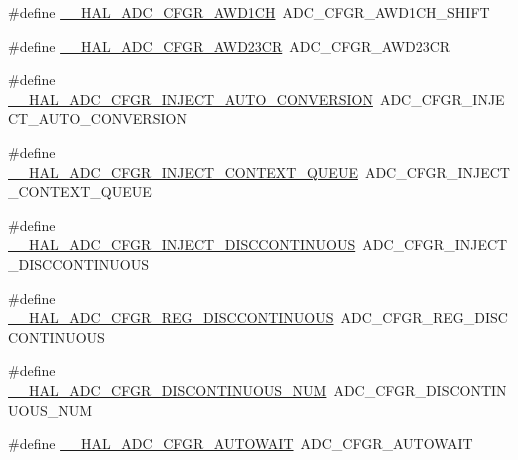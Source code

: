 \begin{DoxyCompactItemize}
\item 
\#define \hyperlink{group___h_a_l___a_d_c___aliased___macros_gaf2b93300d6c91bbe5a0253368ade466f}{\+\_\+\+\_\+\+H\+A\+L\+\_\+\+A\+D\+C\+\_\+\+C\+F\+G\+R\+\_\+\+A\+W\+D1\+CH}~A\+D\+C\+\_\+\+C\+F\+G\+R\+\_\+\+A\+W\+D1\+C\+H\+\_\+\+S\+H\+I\+FT
\item 
\#define \hyperlink{group___h_a_l___a_d_c___aliased___macros_ga73200fff4fe5aa62989ea33522fa3cfc}{\+\_\+\+\_\+\+H\+A\+L\+\_\+\+A\+D\+C\+\_\+\+C\+F\+G\+R\+\_\+\+A\+W\+D23\+CR}~A\+D\+C\+\_\+\+C\+F\+G\+R\+\_\+\+A\+W\+D23\+CR
\item 
\#define \hyperlink{group___h_a_l___a_d_c___aliased___macros_ga16b4ff7c58c0fe8141bd8bf6adf0f27c}{\+\_\+\+\_\+\+H\+A\+L\+\_\+\+A\+D\+C\+\_\+\+C\+F\+G\+R\+\_\+\+I\+N\+J\+E\+C\+T\+\_\+\+A\+U\+T\+O\+\_\+\+C\+O\+N\+V\+E\+R\+S\+I\+ON}~A\+D\+C\+\_\+\+C\+F\+G\+R\+\_\+\+I\+N\+J\+E\+C\+T\+\_\+\+A\+U\+T\+O\+\_\+\+C\+O\+N\+V\+E\+R\+S\+I\+ON
\item 
\#define \hyperlink{group___h_a_l___a_d_c___aliased___macros_ga5010d7820f890534d6b6005438038ef5}{\+\_\+\+\_\+\+H\+A\+L\+\_\+\+A\+D\+C\+\_\+\+C\+F\+G\+R\+\_\+\+I\+N\+J\+E\+C\+T\+\_\+\+C\+O\+N\+T\+E\+X\+T\+\_\+\+Q\+U\+E\+UE}~A\+D\+C\+\_\+\+C\+F\+G\+R\+\_\+\+I\+N\+J\+E\+C\+T\+\_\+\+C\+O\+N\+T\+E\+X\+T\+\_\+\+Q\+U\+E\+UE
\item 
\#define \hyperlink{group___h_a_l___a_d_c___aliased___macros_gaeaa692ac73b859de118c28bc0327cf77}{\+\_\+\+\_\+\+H\+A\+L\+\_\+\+A\+D\+C\+\_\+\+C\+F\+G\+R\+\_\+\+I\+N\+J\+E\+C\+T\+\_\+\+D\+I\+S\+C\+C\+O\+N\+T\+I\+N\+U\+O\+US}~A\+D\+C\+\_\+\+C\+F\+G\+R\+\_\+\+I\+N\+J\+E\+C\+T\+\_\+\+D\+I\+S\+C\+C\+O\+N\+T\+I\+N\+U\+O\+US
\item 
\#define \hyperlink{group___h_a_l___a_d_c___aliased___macros_gad118cacc67e8c3f930008f5aa6d8dade}{\+\_\+\+\_\+\+H\+A\+L\+\_\+\+A\+D\+C\+\_\+\+C\+F\+G\+R\+\_\+\+R\+E\+G\+\_\+\+D\+I\+S\+C\+C\+O\+N\+T\+I\+N\+U\+O\+US}~A\+D\+C\+\_\+\+C\+F\+G\+R\+\_\+\+R\+E\+G\+\_\+\+D\+I\+S\+C\+C\+O\+N\+T\+I\+N\+U\+O\+US
\item 
\#define \hyperlink{group___h_a_l___a_d_c___aliased___macros_ga6c152cf129addeff1a7f296fa89b04af}{\+\_\+\+\_\+\+H\+A\+L\+\_\+\+A\+D\+C\+\_\+\+C\+F\+G\+R\+\_\+\+D\+I\+S\+C\+O\+N\+T\+I\+N\+U\+O\+U\+S\+\_\+\+N\+UM}~A\+D\+C\+\_\+\+C\+F\+G\+R\+\_\+\+D\+I\+S\+C\+O\+N\+T\+I\+N\+U\+O\+U\+S\+\_\+\+N\+UM
\item 
\#define \hyperlink{group___h_a_l___a_d_c___aliased___macros_ga2b6be3d51e5b71511f3db77d6781fc85}{\+\_\+\+\_\+\+H\+A\+L\+\_\+\+A\+D\+C\+\_\+\+C\+F\+G\+R\+\_\+\+A\+U\+T\+O\+W\+A\+IT}~A\+D\+C\+\_\+\+C\+F\+G\+R\+\_\+\+A\+U\+T\+O\+W\+A\+IT

\end{DoxyCompactItemize}
